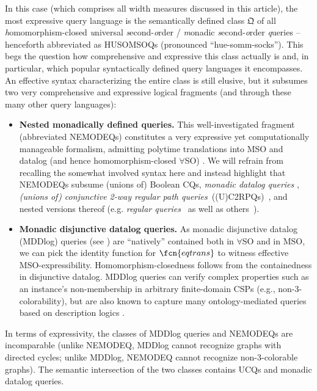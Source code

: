 \medskip {}
In this case (which comprises all width measures discussed in this article), the most expressive query language is the semantically defined class $\mathfrak{Q}$ of all \emph{h}omomorphism-closed \emph{u}niversal \emph{s}econd-\emph{o}rder / \emph{m}onadic \emph{s}econd-\emph{o}rder \emph{q}ueries -- henceforth abbreviated as HUSOMSOQs (pronounced ``hue-somm-socks''). This begs the question how comprehensive and expressive this class actually is and, in particular, which popular syntactically defined query languages it encompasses. An effective syntax characterizing the entire class is still elusive, but it subsumes two very comprehensive and expressive logical fragments (and through these many other query languages):

\begin{itemize}
\item
{\bf Nested monadically defined queries.}
This well-investigated fragment (abbreviated NEMODEQs) constitutes a very expressive yet computationally manageable formalism, admitting polytime translations into MSO and datalog (and hence homomorphism-closed $\forall$SO) \cite{RudKro13}.
We will refrain from recalling the somewhat involved syntax here and instead highlight that NEMODEQs subsume (unions of) Boolean CQs,
\emph{monadic datalog queries} \cite{Cosmadakis88}, \emph{(unions of) conjunctive 2-way regular path queries}~((U)C2RPQs)~\cite{FlorescuLS98}, and nested versions thereof (e.g. \emph{regular queries}~\cite{ReutterRV17} as well as others~\cite{BourhisKR14}).

\item
{\bf Monadic disjunctive datalog queries.}
 As monadic disjunctive datalog (MDDlog) queries (see ) are ``natively'' contained both in $\forall$SO and in MSO, we can pick the identity function for $\fcn{eqtrans}$ %
    to witness effective MSO-expressibility. Homomorphism-closedness follows from the containedness in disjunctive datalog. MDDlog queries can verify complex properties such as an instance's non-membership in arbitrary finite-domain CSPs (e.g., non-3-colorability), but are also known to capture many ontology-mediated queries based on description logics \cite{BienvenuCLW14,FeierKL19}.
\end{itemize}
In terms of expressivity, the classes of MDDlog queries and NEMODEQs are incomparable \remarkstart{}(unlike NEMODEQ, MDDlog cannot recognize graphs with directed cycles; unlike MDDlog, NEMODEQ cannot recognize non-3-colorable graphs)\color{black}. The semantic intersection of the two classes contains UCQs and monadic datalog queries.

